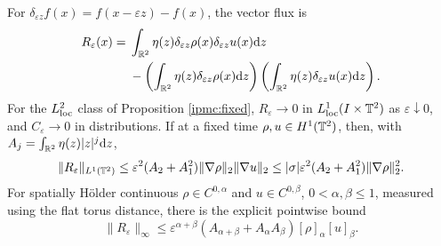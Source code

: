 \begin{proposition}\label{ipmc:increments}
For $\delta_{\varepsilon z}f(x)=f(x-\varepsilon z)-f(x)$, the vector flux is
\begin{align}\label{ipmc:increments-eq}
R_\varepsilon(x)
={}&\int_{\mathbb R^2}\eta(z)\delta_{\varepsilon z}\rho(x)
                    \delta_{\varepsilon z}u(x)\mathrm d z\\
&-\left(\int_{\mathbb R^2}\eta(z)\delta_{\varepsilon z}\rho(x)\mathrm d z\right)
 \left(\int_{\mathbb R^2}\eta(z)\delta_{\varepsilon z}u(x)\mathrm d z\right).\notag
\end{align}
For the $L^2_{\rm loc}$ class of Proposition \ref{ipmc:fixed},
$R_\varepsilon\to0$ in $L^1_{\rm loc}(I\times\mathbb T^2)$ as $\varepsilon\downarrow0$,
and $C_\varepsilon\to0$ in distributions. If at a fixed time $\rho,u\in H^1(\mathbb T^2)$,
then, with $A_j=\int_{\mathbb R^2}\eta(z)|z|^j\mathrm d z$,
\begin{equation}\label{ipmc:H1}
\|R_\varepsilon\|_{L^1(\mathbb T^2)}
\le\varepsilon^2(A_2+A_1^2)\|\nabla\rho\|_2\|\nabla u\|_2
\le |\sigma|\varepsilon^2(A_2+A_1^2)\|\nabla\rho\|_2^2.
\end{equation}
For spatially H\"older continuous $\rho\in C^{0,\alpha}$ and
$u\in C^{0,\beta}$, $0<\alpha,\beta\le1$, measured using the flat torus
distance, there is the explicit pointwise bound
\begin{equation}\label{ipmc:holder}
\|R_\varepsilon\|_\infty
\le\varepsilon^{\alpha+\beta}
(A_{\alpha+\beta}+A_\alpha A_\beta)[\rho]_{\alpha}[u]_{\beta}.
\end{equation}
\end{proposition}
